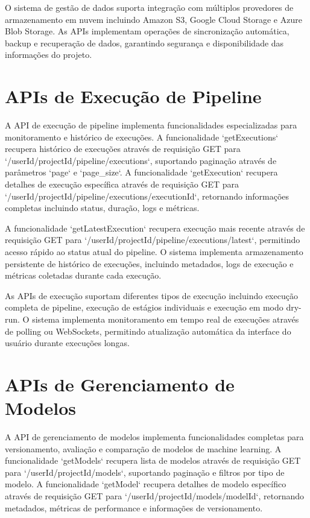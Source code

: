 \documentclass[12pt,a4paper]{article}
\begin{document}
O sistema de gestão de dados suporta integração com múltiplos provedores de armazenamento em nuvem incluindo Amazon S3, Google Cloud Storage e Azure Blob Storage. As APIs implementam operações de sincronização automática, backup e recuperação de dados, garantindo segurança e disponibilidade das informações do projeto.

\section{APIs de Execução de Pipeline}

A API de execução de pipeline implementa funcionalidades especializadas para monitoramento e histórico de execuções. A funcionalidade `getExecutions` recupera histórico de execuções através de requisição GET para `/{userId}/{projectId}/pipeline/executions`, suportando paginação através de parâmetros `page` e `page_size`. A funcionalidade `getExecution` recupera detalhes de execução específica através de requisição GET para `/{userId}/{projectId}/pipeline/executions/{executionId}`, retornando informações completas incluindo status, duração, logs e métricas.

A funcionalidade `getLatestExecution` recupera execução mais recente através de requisição GET para `/{userId}/{projectId}/pipeline/executions/latest`, permitindo acesso rápido ao status atual do pipeline. O sistema implementa armazenamento persistente de histórico de execuções, incluindo metadados, logs de execução e métricas coletadas durante cada execução.

As APIs de execução suportam diferentes tipos de execução incluindo execução completa de pipeline, execução de estágios individuais e execução em modo dry-run. O sistema implementa monitoramento em tempo real de execuções através de polling ou WebSockets, permitindo atualização automática da interface do usuário durante execuções longas.

\section{APIs de Gerenciamento de Modelos}

A API de gerenciamento de modelos implementa funcionalidades completas para versionamento, avaliação e comparação de modelos de machine learning. A funcionalidade `getModels` recupera lista de modelos através de requisição GET para `/{userId}/{projectId}/models`, suportando paginação e filtros por tipo de modelo. A funcionalidade `getModel` recupera detalhes de modelo específico através de requisição GET para `/{userId}/{projectId}/models/{modelId}`, retornando metadados, métricas de performance e informações de versionamento.
\end{document}
